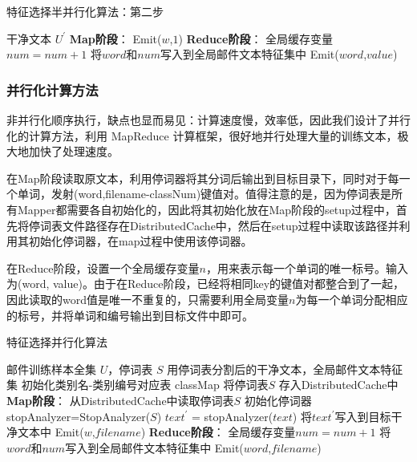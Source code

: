 \documentclass[lang=cn,11pt]{elegantpaper}
\begin{document}
\begin{algorithm}[!htb]
  \caption{特征选择半并行化算法：第二步}
  \label{alg:Framwork}
  \begin{algorithmic}[1]
    \Require
    干净文本 $U^\prime$
    \Ensure
    \State \textbf{Map阶段}：
        \State Emit($w$,$1$)
      \EndFor
    \EndFunction
    \State \textbf{Reduce阶段}：
      \State 全局缓存变量$num=num+1$
      \State 将$word$和$num$写入到全局邮件文本特征集中
      \State Emit($word$,$value$)
    \EndFunction
  \end{algorithmic}
\end{algorithm}

\subsubsection{并行化计算方法}
非并行化顺序执行，缺点也显而易见：计算速度慢，效率低，因此我们设计了并行化的计算方法，利用 MapReduce 计算框架，很好地并行处理大量的训练文本，极大地加快了处理速度。\par
在Map阶段读取原文本，利用停词器将其分词后输出到目标目录下，同时对于每一个单词，发射(word,filename-classNum)键值对。值得注意的是，因为停词表是所有Mapper都需要各自初始化的，因此将其初始化放在Map阶段的setup过程中，首先将停词表文件路径存在DistributedCache中，然后在setup过程中读取该路径并利用其初始化停词器，在map过程中使用该停词器。\par
在Reduce阶段，设置一个全局缓存变量$n$，用来表示每一个单词的唯一标号。输入为(word, value)。由于在Reduce阶段，已经将相同key的键值对都整合到了一起，因此读取的word值是唯一不重复的，只需要利用全局变量$n$为每一个单词分配相应的标号，并将单词和编号输出到目标文件中即可。\par
\begin{algorithm}[!htb]  
  \caption{特征选择并行化算法}  
  \label{alg:Framwork}
  \begin{algorithmic}[1]
    \Require
    邮件训练样本全集 $U$，停词表 $S$
    \Ensure 
    用停词表分割后的干净文本，全局邮件文本特征集
    \State 初始化类别名-类别编号对应表 classMap
    \State 将停词表$S$ 存入DistributedCache中
    \State \textbf{Map阶段}：
    \State 从DistributedCache中读取停词表$S$
    \State 初始化停词器 stopAnalyzer=StopAnalyzer($S$)
    \EndFunction
      \State $text^\prime$ = stopAnalyzer($text$)
      \State 将$text^\prime$写入到目标干净文本中
        \State Emit($w$,$filename$)
      \EndFor
    \EndFunction
    \State \textbf{Reduce阶段}：
      \State 全局缓存变量$num=num+1$
      \State 将$word$和$num$写入到全局邮件文本特征集中
      \State Emit($word$,$filename$)
    \EndFunction
  \end{algorithmic}
\end{algorithm}
\end{document}

